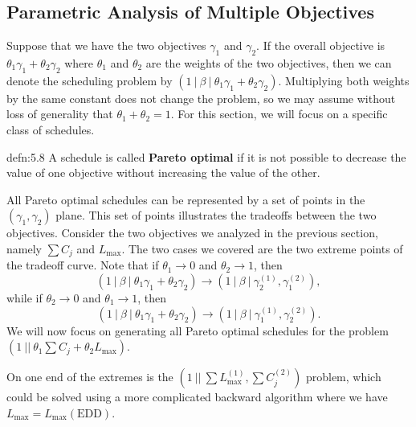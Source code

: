 \subsection{Parametric Analysis of Multiple Objectives} \label{subsec:5.3}
Suppose that we have the two objectives $\gamma_1$ and $\gamma_2$. If 
the overall objective is $\theta_1 \gamma_1 + \theta_2 \gamma_2$ where 
$\theta_1$ and $\theta_2$ are the weights of the two objectives, then 
we can denote the scheduling problem by $(1~|~\beta~|~\theta_1 \gamma_1 
+ \theta_2 \gamma_2)$. Multiplying both weights by the same constant 
does not change the problem, so we may assume without loss of generality 
that $\theta_1 + \theta_2 = 1$. For this section, we will focus on a 
specific class of schedules. 

\begin{defn}{defn:5.8}
    A schedule is called {\bf Pareto optimal} if it is not possible to 
    decrease the value of one objective without increasing the value of 
    the other. 
\end{defn}

All Pareto optimal schedules can be represented by a set of points in the 
$(\gamma_1, \gamma_2)$ plane. This set of points illustrates the tradeoffs 
between the two objectives. Consider the two objectives we analyzed in the 
previous section, namely $\sum C_j$ and $L_{\max}$. The two cases 
we covered are the two extreme points of the tradeoff curve. Note that 
if $\theta_1 \to 0$ and $\theta_2 \to 1$, then 
\[ (1~|~\beta~|~\theta_1\gamma_1 + \theta_2\gamma_2) \to 
(1~|~\beta~|~\gamma_2^{(1)}, \gamma_1^{(2)}), \] 
while if $\theta_2 \to 0$ and $\theta_1 \to 1$, then 
\[ (1~|~\beta~|~\theta_1\gamma_1 + \theta_2\gamma_2) \to 
(1~|~\beta~|~\gamma_1^{(1)}, \gamma_2^{(2)}). \] 
We will now focus on generating all Pareto optimal schedules for the 
problem $(1~||~\theta_1 \sum C_j + \theta_2 L_{\max})$. 

On one end of the extremes is the $(1~||~\sum L_{\max}^{(1)}, \sum C_j^{(2)})$ 
problem, which could be solved using a more complicated backward algorithm
where we have $L_{\max} = L_{\max}(\text{EDD})$. 


